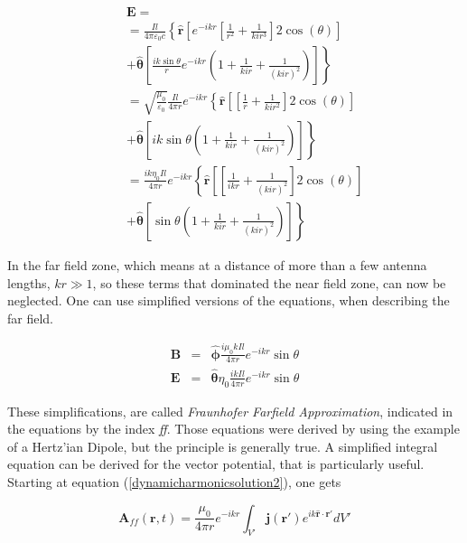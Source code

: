 \documentclass[a4paper,11pt]{report}
\begin{document}
\begin{eqnarray} \label{get_E_hd}
&&\mathbf{E}=\\
&&=\frac{  I l}{4 \pi \varepsilon_0 c} \left\{ \mathbf{\hat{r}} \left[ e^{-ikr } \left[  \frac{ 1}{ r^2} +\frac{1}{kir^3}\right]   2  \cos (\theta )   \right] \right. \nonumber\\
&&\left. +\mathbf{ \hat{\theta}} \left[ \frac{ik \sin \theta}{r}  e^{-ikr } \left( 1 + \frac{1}{kir}+  \frac{1}{(kir)^2} \right) \right] \right\} \nonumber  \\
&&=\sqrt{\frac{\mu_0}{ \varepsilon_0}}\frac{  I l}{4 \pi r} e^{-ikr } \left\{ \mathbf{\hat{r}} \left[  \left[  \frac{ 1}{ r} +\frac{1}{kir^2}\right]   2  \cos (\theta )   \right]  \right. \nonumber\\
&&\left.+\mathbf{ \hat{\theta}} \left[ ik \sin \theta   \left( 1 + \frac{1}{kir}+  \frac{1}{(kir)^2} \right) \right] \right\} \nonumber  \\
&&=\frac{i k \eta_0 I l}{4 \pi r} e^{-ikr } \left\{ \mathbf{\hat{r} }\left[  \left[  \frac{ 1}{ i k r} +\frac{1}{(kir)^2}\right]   2  \cos (\theta )   \right] \right. \nonumber\\
&&\left.+\mathbf{ \hat{\theta}} \left[  \sin \theta   \left( 1 + \frac{1}{kir}+  \frac{1}{(kir)^2} \right) \right] \right\} \nonumber
\end{eqnarray}


In the far field zone, which means at a distance of more than a few antenna lengths, $kr \gg 1$, so these terms  that dominated the near field zone, can now be neglected. One can use simplified versions of the equations, when describing the far field.

\begin{eqnarray}
\mathbf{B} &=& \mathbf{\hat{\phi}} \frac{i \mu_0 k I l}{4 \pi r} e^{-ikr } \sin \theta \label{fraunhofer_B} \\
\mathbf{E} &=&\mathbf{ \hat{\theta}} \eta_0 \frac{i k I l}{4 \pi r} e^{-ikr } \sin \theta \label{fraunhofer_E} 
\end{eqnarray}


These simplifications, are called \emph{Fraunhofer Farfield Approximation}, indicated in the equations by the index \emph{ff}. Those equations were derived by using the example of a Hertz'ian Dipole, but the principle is generally true. A simplified integral equation can be derived for the vector potential, that is particularly useful. Starting at equation (\ref{dynamicharmonicsolution2}), one gets

\begin{equation}\label{fraunhofer_A}
 \mathbf{A}_{ff}(\mathbf{r},t) = \frac{\mu_0}{4 \pi r} e^{-ikr} \int_{V'} \mathbf{j}(\mathbf{r}') e^{ik \mathbf{\hat{r}} \cdot \mathbf{r}' } dV'
\end{equation}
\end{document}
